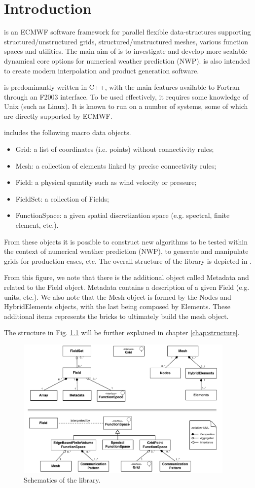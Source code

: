 \chapter{Introduction}
\Atlas is an ECMWF software framework for parallel flexible 
data-structures supporting structured/unstructured grids, 
structured/unstructured meshes, various function spaces 
and utilities.  
The main aim of \Atlas is to investigate and develop more 
scalable dynamical core options for numerical weather prediction 
(NWP). \Atlas is also intended to create modern interpolation 
and product generation software.

\Atlas is predominantly written in C++, with the main features 
available to Fortran through an F2003 interface. To be used 
effectively, it requires some knowledge of Unix (such as Linux). 
It is known to run on a number of systems, some of which are 
directly supported by ECMWF.

\Atlas includes the following macro data objects.
%
\begin{itemize}
\item Grid: a list of coordinates (i.e. points) without connectivity rules;
\item Mesh: a collection of elements linked by precise connectivity rules;
\item Field: a physical quantity such as wind velocity or pressure;
\item FieldSet: a collection of Fields;
\item FunctionSpace: a given spatial discretization space (e.g. spectral, 
finite element, etc.).
\end{itemize}
%
From these objects it is possible to construct new algorithms 
to be tested within the context of numerical weather prediction 
(NWP), to generate and manipulate grids for production 
cases, etc. The overall structure of the library is depicted 
in .

From this figure, we note that there is the additional object 
called Metadata and related to the Field object. Metadata 
contains a description of a given Field (e.g. units, etc.).
We also note that the Mesh object is formed by the Nodes 
and HybridElements objects, with the last being composed 
by Elements. These additional items represents the bricks 
to ultimately build the mesh object.
 
The structure in Fig. \ref{fig:intro-schematics} will be 
further explained in chapter \ref{chap:structure}.
%
\begin{figure}[htb!]
\centering
\includegraphics[width=0.95\textwidth]{imgs/schematics.png}
\caption{Schematics of the \Atlas library.}
\label{fig:intro-schematics}
\end{figure}
%